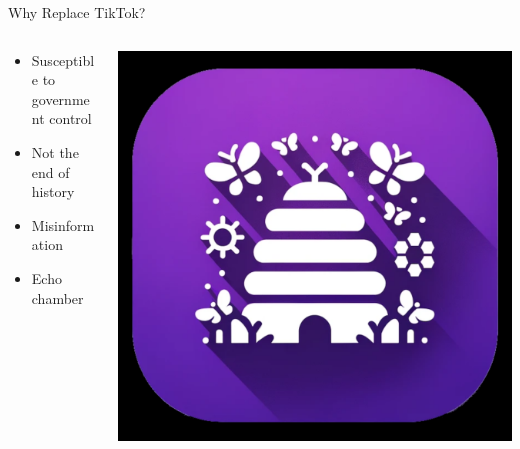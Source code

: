 \documentclass[aspectratio=169]{beamer}
\begin{document}
\begin{frame}{Why Replace TikTok?}

\begin{columns}[T]
    \begin{column}[T]{0.5\textwidth}
        \begin{itemize}
            \item Susceptible to government control
            \item Not the end of history
            \item Misinformation
            \item Echo chamber
        \end{itemize}
    \end{column}
    
    \begin{column}{0.5\textwidth}
        \includegraphics[height=0.8\textheight]{imgs/app_icons/2.png}
    \end{column}
\end{columns}

\end{frame}
\end{document}
